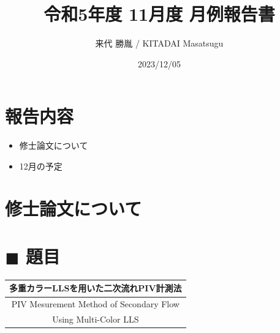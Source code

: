 \documentclass[twocolumn,a4j]{jsarticle}
\author{来代 勝胤 / KITADAI Masatsugu}
\title{令和5年度 11月度 月例報告書}
\date{2023/12/05}
\begin{document}
\columnseprule=0.1mm
\maketitle

\section*{報告内容}
\begin{itemize}
  \item 修士論文について
  \item 12月の予定
\end{itemize}

\section*{修士論文について}

\begin{table}[hbtp]
  \section*{$\blacksquare$ 題目}
  \centering
  \begin{tabular}{c}
    \hline
    多重カラーLLSを用いた二次流れPIV計測法  \\ \hline
    PIV Mesurement Method of Secondary Flow \\
    Using Multi-Color LLS                   \\ \hline
  \end{tabular}
\end{table}
\end{document}
